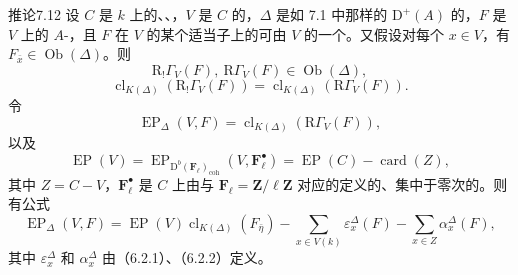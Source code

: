 \begin{SGAresult}{推论}{7.12}
设 $C$ 是 $k$ 上的、、，$V$ 是 $C$ 的，$\Delta$ 是如 7.1 中那样的 $\mathrm D^+(A)$ 的，$F$ 是 $V$ 上的 $A$-，且 $F$ 在 $V$ 的某个适当子上的可由 $V$ 的一个。又假设对每个 $x\in V$，有 $F_{\bar x}\in\operatorname{Ob}(\Delta)$。则
\[
\mathrm R_!\Gamma_V(F),\ \mathrm R\Gamma_V(F)\in\operatorname{Ob}(\Delta),\tag{*}
\]
\[
\operatorname{cl}_{K(\Delta)}(\mathrm R_!\Gamma_V(F))
=\operatorname{cl}_{K(\Delta)}(\mathrm R\Gamma_V(F)).\tag{**}
\]
令
\[
\operatorname{EP}_\Delta(V,F)=\operatorname{cl}_{K(\Delta)}(\mathrm R\Gamma_V(F)),
\]
以及
\[
\operatorname{EP}(V)=\operatorname{EP}_{\mathrm D^b(\mathbf F_\ell)_{\mathrm{coh}}}(V,\mathbf F_\ell^\bullet)
=\operatorname{EP}(C)-\operatorname{card}(Z),
\]
其中 $Z=C-V$，$\mathbf F_\ell^\bullet$ 是 $C$ 上由与 $\mathbf F_\ell=\mathbf Z/\ell\mathbf Z$ 对应的定义的、集中于零次的。则有公式
\[
\operatorname{EP}_\Delta(V,F)
=\operatorname{EP}(V)\operatorname{cl}_{K(\Delta)}(F_{\bar\eta})
-\sum_{x\in V(k)}\varepsilon_x^\Delta(F)
-\sum_{x\in Z}\alpha_x^\Delta(F),\tag{7.13}
\]
其中 $\varepsilon_x^\Delta$ 和 $\alpha_x^\Delta$ 由（6.2.1）、（6.2.2）定义。
\end{SGAresult}

